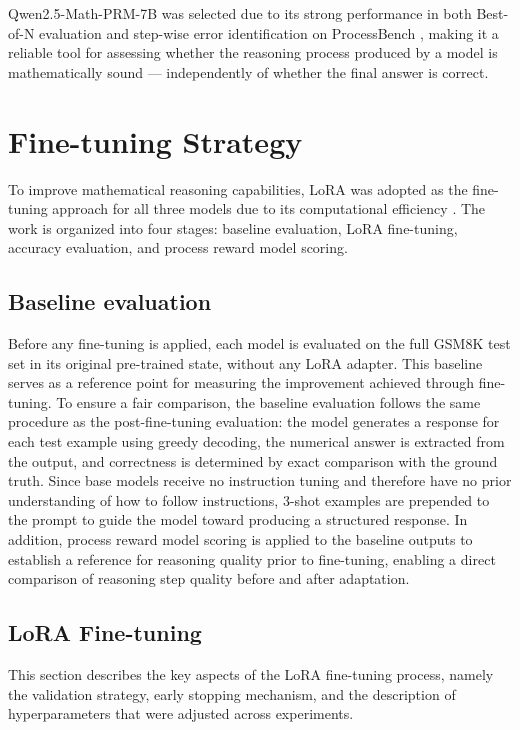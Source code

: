  Qwen2.5-Math-PRM-7B was selected due to its strong performance
  in both Best-of-N evaluation and step-wise error identification
  on ProcessBench \cite{zheng-etal-2025-processbench, qwen2025prm}, making it a reliable
  tool
  for assessing whether the reasoning process produced by a model
  is mathematically sound --- independently of whether the final
  answer is correct.
\section{Fine-tuning Strategy}
\label{sec:finetuning-strategy}

To improve mathematical reasoning capabilities, LoRA was adopted as the fine-tuning approach for all three models due to its computational efficiency \cite{hu2022lora}. The work is organized into four stages: baseline evaluation, LoRA fine-tuning, accuracy evaluation, and process reward model scoring.

\subsection{Baseline evaluation}
Before any fine-tuning is applied, each model is evaluated on
  the full GSM8K test set in its original pre-trained state,
  without any LoRA adapter. This baseline serves as a reference
  point for measuring the improvement achieved through fine-tuning.
  To ensure a fair comparison, the baseline evaluation follows the
  same procedure as the post-fine-tuning evaluation: the model
  generates a response for each test example using greedy
  decoding, the numerical answer is extracted from the output, and
  correctness is determined by exact comparison with the ground
  truth. Since base models receive no instruction tuning and
  therefore have no prior understanding of how to follow instructions,
  3-shot examples are prepended to the prompt to guide the
  model toward producing a structured response. In addition, process reward
  model scoring is applied to the baseline outputs to establish a
  reference for reasoning quality prior to fine-tuning, enabling
  a direct comparison of reasoning step quality before and after
  adaptation.

\subsection{LoRA Fine-tuning}
This section describes the key aspects of the
  LoRA fine-tuning process, namely the validation
  strategy, early stopping mechanism, and the
  description of hyperparameters that were
  adjusted across experiments.




